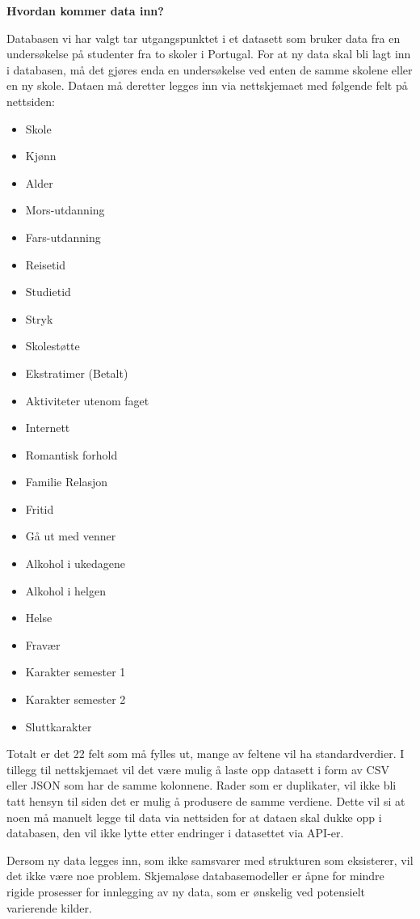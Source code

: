 \textbf{Hvordan kommer data inn?}

Databasen vi har valgt tar utgangspunktet i et datasett som bruker data fra en undersøkelse på studenter fra to skoler i Portugal. For at ny data skal bli lagt inn i databasen, må det gjøres enda en undersøkelse ved enten de samme skolene eller en ny skole. Dataen må deretter legges inn via nettskjemaet med følgende felt på nettsiden:

\begin{itemize}
  \item Skole
  \item Kjønn
  \item Alder
  \item Mors-utdanning
  \item Fars-utdanning
  \item Reisetid
  \item Studietid
  \item Stryk
  \item Skolestøtte
  \item Ekstratimer (Betalt)
  \item Aktiviteter utenom faget
  \item Internett
  \item Romantisk forhold
  \item Familie Relasjon
  \item Fritid
  \item Gå ut med venner
  \item Alkohol i ukedagene
  \item Alkohol i helgen
  \item Helse
  \item Fravær
  \item Karakter semester 1
  \item Karakter semester 2
  \item Sluttkarakter
\end{itemize}

Totalt er det 22 felt som må fylles ut, mange av feltene vil ha standardverdier. I tillegg til nettskjemaet vil det være mulig å laste opp datasett i form av CSV eller JSON som har de samme kolonnene. Rader som er duplikater, vil ikke bli tatt hensyn til siden det er mulig å produsere de samme verdiene. Dette vil si at noen må manuelt legge til data via nettsiden for at dataen skal dukke opp i databasen, den vil ikke lytte etter endringer i datasettet via API-er.

Dersom ny data legges inn, som ikke samsvarer med strukturen som eksisterer, vil det ikke være noe problem. Skjemaløse databasemodeller er åpne for mindre rigide prosesser for innlegging av ny data, som er ønskelig ved potensielt varierende kilder.


